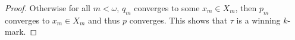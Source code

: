 \begin{proof}
  Otherwise for all $m<\omega$, $q_m$ converges to some $x_m\in X_m$,
  then $p_m$ converges to $x_m\in X_m$ and thus $p$ converges. This
  shows that $\tau$ is a winning $k$-mark.
\end{proof}












